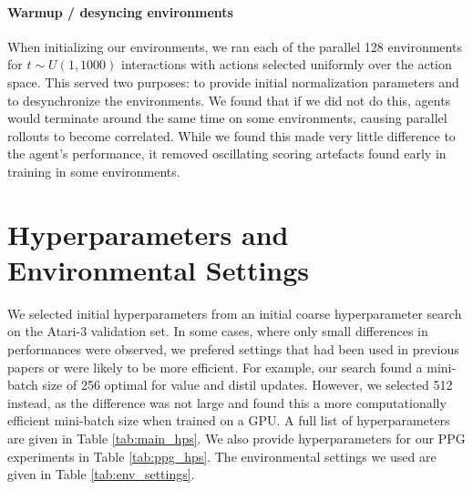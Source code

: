 \documentclass{article}
\begin{document}
\paragraph{Warmup / desyncing environments} When initializing our environments, we ran each of the parallel 128 environments for $t \sim U(1,1000)$ interactions with actions selected uniformly over the action space. This served two purposes: to provide initial normalization parameters and to desynchronize the environments. We found that if we did not do this, agents would terminate around the same time on some environments, causing parallel rollouts to become correlated. While we found this made very little difference to the agent's performance, it removed oscillating scoring artefacts found early in training in some environments.


\section{Hyperparameters and Environmental Settings}
\label{app:hyperparameters}

We selected initial hyperparameters from an initial coarse hyperparameter search on the Atari-3 validation set. In some cases, where only small differences in performances were observed, we prefered settings that had been used in previous papers or were likely to be more efficient. For example, our search found a mini-batch size of 256 optimal for value and distil updates. However, we selected 512 instead, as the difference was not large and found this a more computationally efficient mini-batch size when trained on a GPU. A full list of hyperparameters are given in Table \ref{tab:main_hps}. We also provide hyperparameters for our PPG experiments in Table \ref{tab:ppg_hps}. The environmental settings we used are given in Table \ref{tab:env_settings}. 
\end{document}
